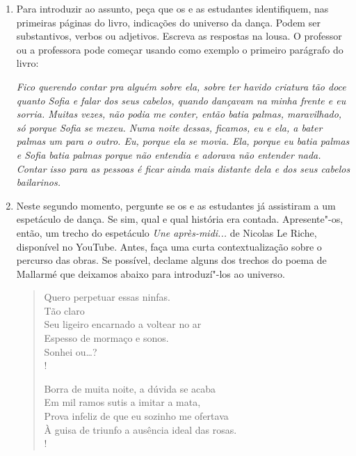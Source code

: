 \documentclass[12pt]{extarticle}
\begin{document}
\begin{enumerate}

  \item
  Para introduzir ao assunto, peça que os e as estudantes identifiquem, nas primeiras
  páginas do livro, indicações do universo da dança. Podem ser substantivos, verbos ou adjetivos. 
  Escreva as respostas na lousa. O professor ou a professora pode começar usando como exemplo
  o primeiro parágrafo do livro:

  \textit{Fico querendo contar pra alguém sobre ela,
sobre ter havido criatura tão doce quanto Sofia e falar
dos seus cabelos, quando \emph{dançavam} na minha frente e
eu sorria. Muitas vezes, não podia me conter, então batia
palmas, maravilhado, só porque Sofia se mexeu. Numa
noite dessas, ficamos, eu e ela, a bater palmas um para o
outro. Eu, porque ela se movia. Ela, porque eu batia palmas e 
Sofia batia palmas porque não entendia e adorava
não entender nada. Contar isso para as pessoas é ficar ainda 
mais distante dela e dos seus cabelos \emph{bailarinos}.}

  \item
  Neste segundo momento, pergunte se os e as estudantes já assistiram a um
  espetáculo de dança. Se sim, qual e qual história era contada. 
  Apresente"-os, então, um trecho do espetáculo \textit{Une après-midi...}
  de Nicolas Le Riche, disponível no YouTube. Antes, faça uma curta 
  contextualização sobre o percurso das obras. Se possível, declame
  alguns dos trechos do poema de Mallarmé que deixamos abaixo para introduzí"-los
  ao universo. 




\begin{verse}
Quero perpetuar essas ninfas.\\
                                    \hspace{5cm}             Tão claro\\
Seu ligeiro encarnado a voltear no ar\\
Espesso de mormaço e sonos.\\
                             \hspace{5cm}                    Sonhei ou…?\\!

Borra de muita noite, a dúvida se acaba\\
Em mil ramos sutis a imitar a mata,\\
Prova infeliz de que eu sozinho me ofertava\\
À guisa de triunfo a ausência ideal das rosas.\\!


\end{verse}
\end{enumerate}
\end{document}
